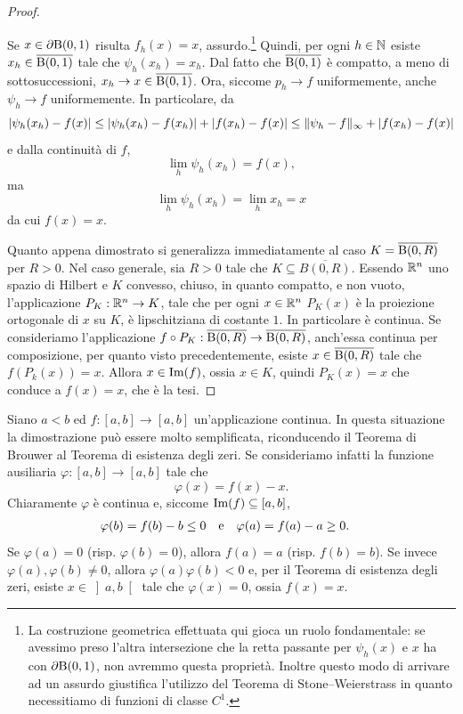 \begin{proof}
\begin{center}
\begin{tikzpicture}[x=0.5pt,y=0.5pt,yscale=-1,xscale=1]
			
		\end{tikzpicture}
	\end{center}
	Se $x \in \partial \textup{B}(0,1)$ risulta $f_h(x)= x$, assurdo.\footnote{La costruzione geometrica effettuata qui gioca un ruolo fondamentale: se avessimo preso l'altra intersezione che la retta passante per $\psi_h(x)$ e $x$ ha con $\partial \textup{B}(0,1)$, non avremmo questa proprietà. Inoltre questo modo di arrivare ad un assurdo giustifica l'utilizzo del Teorema di Stone--Weierstrass in quanto necessitiamo di funzioni di classe $C^1$.} Quindi, per ogni $h \in \mathbb{N}$ esiste $x_h \in \overline{\textup{B}(0,1)}$ tale che $\psi_h(x_h) = x_h$. Dal fatto che $\overline{\textup{B}(0,1)}$ è compatto, a meno di sottosuccessioni, $x_h \to x \in \overline{\textup{B}(0,1)}$. Ora, siccome $p_h \to f$ uniformemente, anche $\psi_h \to f$ uniformemente. In particolare, da 
	\[ \lvert\psi_h(x_h) - f(x)\rvert \le \lvert\psi_h(x_h) - f(x_h)\rvert + \lvert f(x_h)-f(x)\rvert \le \lVert\psi_h -f\rVert_\infty + \lvert f(x_h)-f(x)\rvert\]
	e dalla continuità di $f$, 
	\[ \lim\limits_{h} \psi_h(x_h) = f(x), \]
	ma 
	\[ \lim\limits_{h} \psi_h(x_h) = \lim\limits_{h} x_h = x \]
	da cui $f(x) = x$.
	
	Quanto appena dimostrato si generalizza immediatamente al caso $K= \overline{\textup{B}(0,R)}$ per $R > 0$. Nel caso generale, sia $R > 0$ tale che $K \subseteq \overline{B(0,R)}$. Essendo $\mathbb{R}^n$ uno spazio di Hilbert e $K$ convesso, chiuso, in quanto compatto, e non vuoto, l'applicazione $P_K: \mathbb{R}^n \to K$, tale che per ogni $x \in \mathbb{R}^n$ $P_K(x)$ è la proiezione ortogonale di $x$ su $K$, è lipschitziana di costante $1$. In particolare è continua. Se consideriamo l'applicazione $f \circ P_K : \overline{\textup{B}(0,R)} \to \overline{\textup{B}(0,R)}$, anch'essa continua per composizione, per quanto visto precedentemente, esiste $x \in \overline{\textup{B}(0,R)}$ tale che $f(P_k(x)) = x$. Allora $x \in \textup{Im}(f)$, ossia $x \in K$, quindi $P_K(x) = x$ che conduce a $f(x) = x$, che è la tesi.
\end{proof}

\begin{osservazione}
	Siano $a<b$ ed $f: [a,b] \to [a,b]$ un'applicazione continua. In questa situazione la dimostrazione può essere molto semplificata, riconducendo il Teorema di Brouwer al Teorema di esistenza degli zeri. Se consideriamo infatti la funzione ausiliaria $\varphi: [a,b] \to [a,b]$ tale che 
	\[ \varphi(x) = f(x) - x. \]
	Chiaramente $\varphi$ è continua e, siccome $\textup{Im}(f) \subseteq [a,b]$, 
	\begin{align*}
		\varphi(b) &= f(b) - b \le 0 & &\textup{e} &  \varphi(a) &= f(a) - a \ge 0.
	\end{align*} 
	Se $\varphi(a) = 0$ (risp. $\varphi(b) = 0$), allora $f(a) = a$ (risp. $f(b) = b$). Se invece $\varphi(a),\varphi(b) \ne 0$, allora $\varphi(a) \varphi(b) < 0$ e, per il Teorema di esistenza degli zeri, esiste $x \in \left] a,b\right[ $ tale che $\varphi(x) = 0$, ossia $f(x) = x$.
\end{osservazione}

